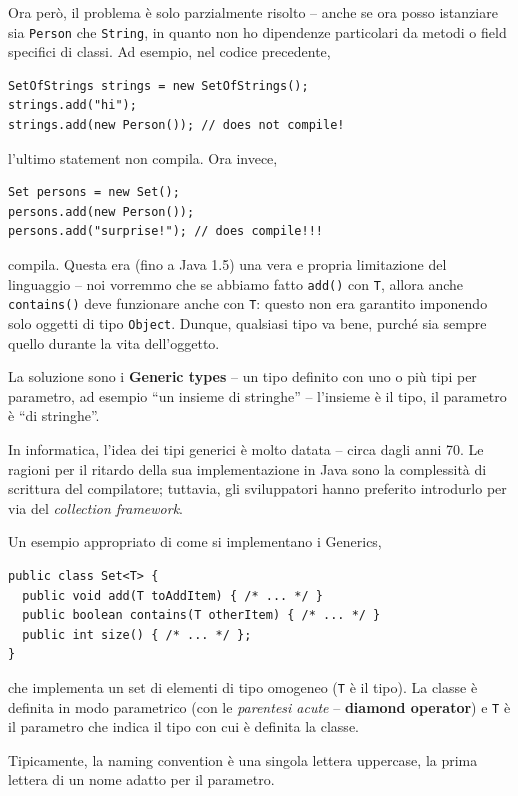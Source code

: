 \documentclass[\fontsizeclass,twocolumn]{\classname}
\theoremstyle{definition}
\theoremstyle{definition}
\begin{document}
Ora però, il problema è solo parzialmente risolto -- anche se ora posso
istanziare sia \texttt{Person} che \texttt{String}, in quanto non ho dipendenze
particolari da metodi o field specifici di classi. Ad esempio, nel codice
precedente,

\begin{lstlisting}
SetOfStrings strings = new SetOfStrings();
strings.add("hi");
strings.add(new Person()); // does not compile!
\end{lstlisting}

l'ultimo statement non compila. Ora invece,

\begin{lstlisting}
Set persons = new Set();
persons.add(new Person());
persons.add("surprise!"); // does compile!!!
\end{lstlisting}

compila. Questa era (fino a Java 1.5) una vera e propria limitazione del
linguaggio -- noi vorremmo che se abbiamo fatto \texttt{add()} con \texttt{T},
allora anche \texttt{contains()} deve funzionare anche con \texttt{T}: questo
non era garantito imponendo solo oggetti di tipo \texttt{Object}. Dunque, qualsiasi tipo va bene, purché sia sempre quello durante la vita dell'oggetto.

La soluzione sono i \textbf{Generic types} -- un tipo definito con uno o più
tipi per parametro, ad esempio ``un insieme di stringhe'' -- l'insieme è il
tipo, il parametro è ``di stringhe''.

In informatica, l'idea dei tipi generici è molto datata -- circa dagli anni 70.
Le ragioni per il ritardo della sua implementazione in Java sono la complessità
di scrittura del compilatore; tuttavia, gli sviluppatori hanno preferito
introdurlo per via del \emph{collection framework}.

Un esempio appropriato di come si implementano i Generics,

\begin{lstlisting}
public class Set<T> {
  public void add(T toAddItem) { /* ... */ }
  public boolean contains(T otherItem) { /* ... */ }
  public int size() { /* ... */ };
}
\end{lstlisting}

che implementa un set di elementi di tipo omogeneo (\texttt{T} è il tipo). La
classe è definita in modo parametrico (con le \emph{parentesi acute} --
\textbf{diamond operator}) e \texttt{T} è il parametro che indica il tipo con
cui è definita la classe.

Tipicamente, la naming convention è una singola lettera uppercase, la prima
lettera di un nome adatto per il parametro.
\end{document}
